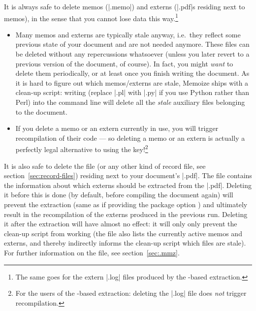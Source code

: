 \documentclass[a4paper,11pt]{article}
\begin{document}
It is always safe to delete memos (|.memo|) and externs (|.pdf|s residing next
to memos), in the sense that you cannot lose data this way.\footnote{The same
  goes for the extern |.log| files produced by the -based
  extraction.}

\begin{itemize}

\item Many memos and externs are typically stale anyway, i.e.\ they reflect
  some previous state of your document and are not needed anymore.  These files
  can be deleted without any repercussions whatsoever (unless you later revert
  to a previous version of the document, of course).  In fact, you might
  \emph{want} to delete them periodically, or at least once you finish writing
  the document.  As it is hard to figure out which memos/externs are stale,
  Memoize ships with a clean-up script: writing 
  \dmmz (replace |.pl| with |.py| if you use Python rather
  than Perl) into the command line will delete all the \emph{stale} auxiliary
  files belonging to the document.

\item If you delete a memo or an extern currently in use, you will trigger
  recompilation of their code --- so deleting a memo or an extern is actually a
  perfectly legal alternative to using the  key!\footnote{For the
    users of the -based extraction: deleting the |.log| file does
    \emph{not} trigger recompilation.}

\end{itemize}

It is also safe to delete the \dmmz file (or any other kind of record file, see
section~\ref{sec:record-files}) residing next to your document's |.pdf|.  The
\dmmz file contains the information about which externs should be extracted
from the |.pdf|.  Deleting it before this is done (by default, before compiling
the document again) will prevent the extraction (same as if providing the
package option ) and ultimately
result in the recompilation of the externs produced in the previous run.
Deleting it after the extraction will have almost no effect: it will only only
prevent the clean-up script from working (the \dmmz file also lists the
currently active memos and externs, and thereby indirectly informs the clean-up
script which files are stale).  For further information on the \dmmz file, see
section~\ref{sec:.mmz}.
\end{document}
